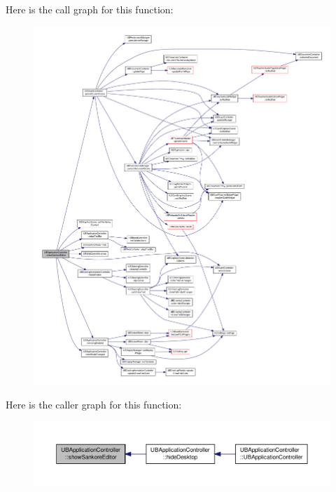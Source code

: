 Here is the call graph for this function\-:
\nopagebreak
\begin{figure}[H]
\begin{center}
\leavevmode
\includegraphics[width=350pt]{da/d14/class_u_b_application_controller_a71f94a70bea749313f269373716b97c7_cgraph}
\end{center}
\end{figure}




Here is the caller graph for this function\-:
\nopagebreak
\begin{figure}[H]
\begin{center}
\leavevmode
\includegraphics[width=350pt]{da/d14/class_u_b_application_controller_a71f94a70bea749313f269373716b97c7_icgraph}
\end{center}
\end{figure}


